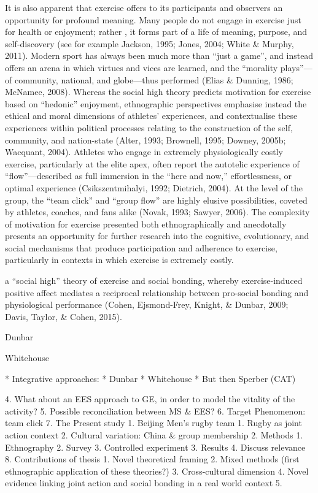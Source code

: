 It is also apparent that exercise offers to its participants and observers an opportunity for profound meaning.  Many people do not engage in exercise just for health or enjoyment; rather , it forms part of a life of meaning, purpose, and self-discovery (see for example Jackson, 1995; Jones, 2004; White & Murphy, 2011). Modern sport has always been much more than ``just a game'', and instead offers an arena in which virtues and vices are learned, and the ``morality plays''—of community, national, and globe—thus performed (Elias & Dunning, 1986; McNamee, 2008).  Whereas the social high theory predicts motivation for exercise based on ``hedonic'' enjoyment, ethnographic perspectives emphasise instead the ethical and moral dimensions of athletes’ experiences, and contextualise these experiences within political processes relating to the construction of the self, community, and nation-state (Alter, 1993; Brownell, 1995; Downey, 2005b; Wacquant, 2004).  Athletes who engage in extremely physiologically costly exercise, particularly at the elite apex, often report the autotelic experience of ``flow''—described as full immersion in the ``here and now,'' effortlessness, or optimal experience (Csikszentmihalyi, 1992; Dietrich, 2004).  At the level of the group, the ``team click'' and ``group flow'' are highly elusive possibilities, coveted by athletes, coaches, and fans alike (Novak, 1993; Sawyer, 2006).  The complexity of motivation for exercise presented both ethnographically and anecdotally presents an opportunity for further research into the cognitive, evolutionary, and social mechanisms that produce participation and adherence to exercise, particularly in contexts in which exercise is extremely costly.

a ``social high'' theory of exercise and social bonding, whereby exercise-induced positive affect mediates a reciprocal relationship between pro-social bonding and physiological performance (Cohen, Ejsmond-Frey, Knight, & Dunbar, 2009; Davis, Taylor, & Cohen, 2015).

Dunbar

Whitehouse



* Integrative approaches:
    * Dunbar
    * Whitehouse
    * But then Sperber (CAT)



4. What about an EES approach to GE, in order to model the vitality of the activity?
5. Possible reconciliation between MS & EES?
6. Target Phenomenon: team click
7. The Present study
    1. Beijing Men’s rugby team
        1. Rugby as joint action context
        2. Cultural variation: China & group membership
    2. Methods
        1. Ethnography
        2. Survey
        3. Controlled experiment
    3. Results
    4. Discuss relevance
8. Contributions of thesis
    1. Novel theoretical framing
    2. Mixed methods (first ethnographic application of these theories?)
    3. Cross-cultural dimension
    4. Novel evidence linking joint action and social bonding in a real world context
    5.


